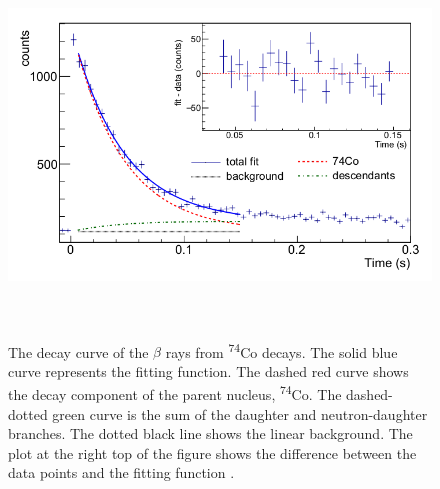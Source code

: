 \documentclass[a4paper,12pt,twoside]{report}
\begin{document}
\newpage
\begin{figure}[h!]
    \centering
    \includegraphics[width=15cm,height=10cm]{half_life.png}
    \caption[The decay curve of the $\beta$ rays from \textsuperscript{74}Co decays]{The decay curve of the $\beta$ rays from \textsuperscript{74}Co decays. The solid blue curve represents the fitting function. The dashed red curve shows the decay component of the parent nucleus,
\textsuperscript{74}Co. The dashed-dotted green curve is the sum of the daughter and neutron-daughter branches. The dotted black line shows the linear background. The plot at the right top of the
figure shows the difference between the data points and the
fitting function \cite{yso2018}.}
    \label{fig:yso_halflife}
\end{figure}

\pagebreak
\end{document}
